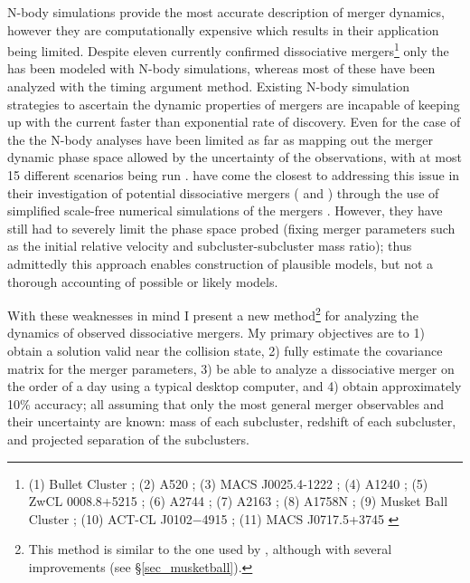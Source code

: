 N-body simulations provide the most accurate description of merger dynamics, however they are computationally expensive which results in their application being limited.
Despite eleven currently confirmed dissociative mergers\footnote{(1) Bullet Cluster \citep{Clowe:2004eq}; 
(2) A520 \citep{Mahdavi:2007ed}; 
(3) MACS J0025.4-1222 \citep{Bradac:2008gw}; 
(4) A1240 \citep{Barrena:2009to}; 
(5) ZwCL 0008.8+5215 \citep{vanWeeren:2011ko}; 
(6) A2744 \citep{Merten:2011gu}; 
(7) A2163 \citep{Okabe:2011gv}; 
(8) A1758N \citep{Ragozzine:2011jj}; 
(9) Musket Ball Cluster \citep{Dawson:2012dl}; 
(10) ACT-CL J0102−4915 \citep{Menanteau:2012bf}; 
(11) MACS J0717.5+3745 \citep{Mroczkowski:2012vs}} only the  has been modeled with N-body simulations, whereas most of these have been analyzed with the timing argument method.
Existing N-body simulation strategies to ascertain the dynamic properties of mergers are incapable of keeping up with the current faster than exponential rate of discovery.
Even for the case of the  the N-body analyses have been limited as far as mapping out the merger dynamic phase space allowed by  the uncertainty of the observations, with at most 15 different scenarios being run \citep{Mastropietro:2008fs}.
\citet{Gomez:2012ex} have come the closest to addressing this issue in their investigation of potential dissociative mergers ( and ) through the use of simplified scale-free numerical simulations of the mergers \citep[see][for details]{Gomez:2000kj}.  
However, they have still had to severely limit the phase space probed (fixing merger parameters such as the initial relative velocity and subcluster-subcluster mass ratio); thus admittedly this approach enables construction of plausible models, but not a thorough accounting of possible or likely models.


With these weaknesses in mind I present a new method\footnote{This method is similar to the one used by \citet{Dawson:2012dl}, although with several improvements (see \S\ref{sec_musketball}).}  for analyzing the dynamics of observed dissociative mergers.
My primary objectives are to 1) obtain a solution valid near the collision state, 2) fully estimate the covariance matrix for the merger parameters, 3) be able to analyze a dissociative merger on the order of a day using a typical desktop computer, and 4) obtain approximately 10\% accuracy; all assuming that only the most general merger observables and their uncertainty are known: mass of each subcluster, redshift of each subcluster, and projected separation of the subclusters.

